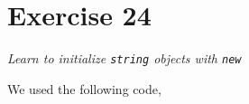 \documentclass[12pt]{article}
\newcommand{\desc}[1]{\textit{#1} \vspace{1em}}
\begin{document}







\clearpage

\section*{Exercise 24}
\desc{Learn to initialize \texttt{string} objects with \texttt{new}}

We used the following code,







\clearpage
\end{document}
